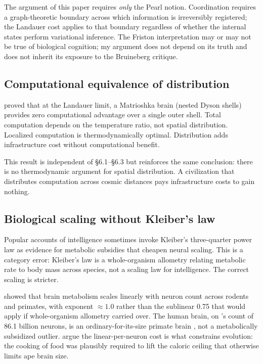 \documentclass[11pt,twocolumn]{article}
\begin{document}
The argument of this paper requires \emph{only} the Pearl notion.
Coordination requires a graph-theoretic boundary across which information
is irreversibly registered; the Landauer cost applies to that boundary
regardless of whether the internal states perform variational inference.
The Friston interpretation may or may not be true of biological cognition;
my argument does not depend on its truth and does not inherit its
exposure to the Bruineberg critique.

\subsection{Computational equivalence of distribution}

\citet{Wright2023} proved that at the Landauer limit, a Matrioshka brain
(nested Dyson shells) provides zero computational advantage over a single
outer shell. Total computation depends on the temperature ratio, not
spatial distribution. Localized computation is thermodynamically optimal.
Distribution adds infrastructure cost without computational benefit.

This result is independent of \S 6.1--\S 6.3 but reinforces the same
conclusion: there is no thermodynamic argument for spatial distribution.
A civilization that distributes computation across cosmic distances pays
infrastructure costs to gain nothing.

\subsection{Biological scaling without Kleiber's law}

Popular accounts of intelligence sometimes invoke Kleiber's three-quarter
power law as evidence for metabolic subsidies that cheapen neural scaling.
This is a category error: Kleiber's law is a whole-organism allometry
relating metabolic rate to body mass across species, not a scaling law for
intelligence. The correct scaling is stricter.

\citet{HerculanoHouzel2011} showed that brain metabolism scales linearly
with neuron count across rodents and primates, with exponent $\approx 1.0$
rather than the sublinear 0.75 that would apply if whole-organism allometry
carried over. The human brain, on \citet{Azevedo2009}'s count of 86.1
billion neurons, is an ordinary-for-its-size primate brain
\citep{HerculanoHouzel2012}, not a metabolically subsidized outlier.
\citet{FonsecaAzevedo2012} argue the linear-per-neuron cost is what
constrains evolution: the cooking of food was plausibly required to lift
the caloric ceiling that otherwise limits ape brain size.
\end{document}
